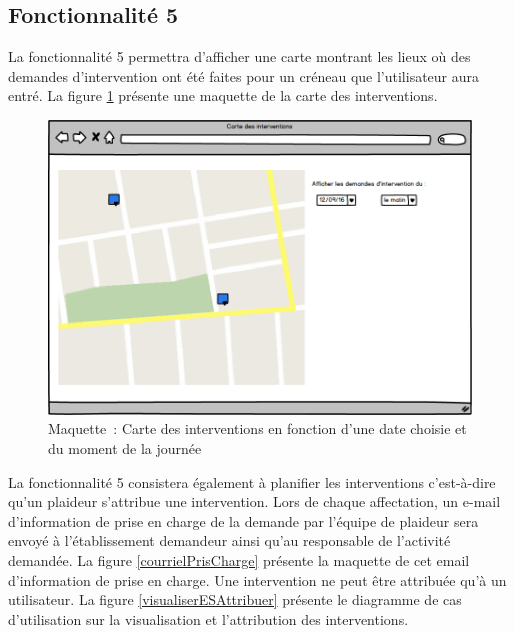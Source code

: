 \newpage
\subsection{Fonctionnalité 5}
La fonctionnalité 5 permettra d'afficher une carte montrant les lieux où des demandes d'intervention ont été faites pour un créneau que l'utilisateur aura entré.
La figure \ref{maquetteCarteIntervention} présente une maquette de la carte des interventions.

\begin{figure}[H]
	\centering
	\includegraphics[scale=0.575]{images/maquettes/fonctionnalite5CarteDesInterventions.png}
	\caption{Maquette~: Carte des interventions en fonction d'une date choisie et du moment de la journée}
	\label{maquetteCarteIntervention}
\end{figure}

La fonctionnalité 5 consistera également à planifier les interventions c'est-à-dire qu'un plaideur s'attribue une intervention.
Lors de chaque affectation, un e-mail d'information de prise en charge de la demande par l'équipe de plaideur sera envoyé à l'établissement demandeur ainsi qu'au responsable de l'activité demandée.
La figure \ref{courrielPrisCharge} présente la maquette de cet email d'information de prise en charge. 
Une intervention ne peut être attribuée qu'à un utilisateur.
  La figure \ref{visualiserESAttribuer} présente le diagramme de cas d'utilisation sur la visualisation et l'attribution des interventions.\\

